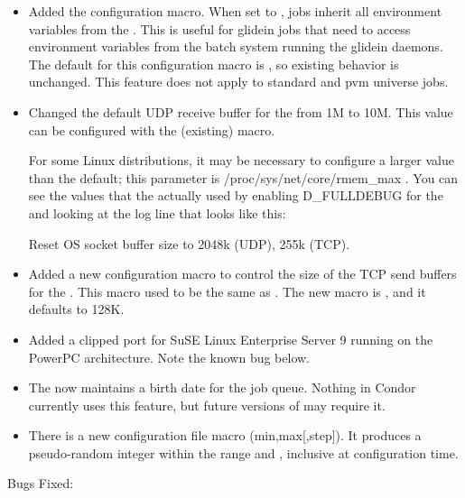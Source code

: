 \begin{itemize}

\item Added the configuration
macro.  When set
to , jobs inherit all environment variables from
the .  This is useful for glidein jobs that need to access
environment variables from the batch system running the glidein daemons.
The default for this configuration macro is , so existing behavior
is unchanged.  This feature does not apply to standard and pvm universe
jobs.

\item Changed the default UDP receive buffer for the
 from 1M to 10M.  This value can be configured with
the (existing)  macro.

\Note For some Linux distributions, it may be necessary to configure
a larger value than the default; this parameter is
/proc/sys/net/core/rmem\_max .  You can see the values that the
 actually used by enabling D\_FULLDEBUG for the
 and looking at the log line that looks like this:

Reset OS socket buffer size to 2048k (UDP), 255k (TCP).

\item Added a new configuration macro to control the size of the
TCP send buffers for the .  This macro used to
be the same as .  The new macro is
, and it defaults to 128K.

\item Added a clipped port for SuSE Linux Enterprise Server 9 running on the 
PowerPC architecture.  Note the known bug below.

\item The  now maintains a birth date for the job queue. 
Nothing in Condor currently uses this feature, but future versions of  may require it. 

\item There is a new configuration file macro
(min,max[,step]).  It produces a
pseudo-random integer within the range \verb@min@ and \verb@max@,
inclusive at configuration time.

\end{itemize}

\noindent Bugs Fixed:

